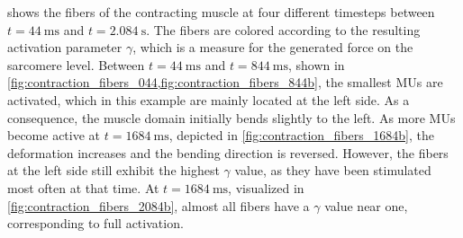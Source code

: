  shows the fibers of the contracting muscle at four different timesteps between $t=\SI{44}{\ms}$ and $t=\SI{2.084}{\s}$. The fibers are colored according to the resulting activation parameter $\gamma$, which is a measure for the generated force on the sarcomere level. Between $t=\SI{44}{\ms}$ and $t=\SI{844}{\ms}$, shown in \cref{fig:contraction_fibers_044,fig:contraction_fibers_844b}, the smallest MUs are activated, which in this example are mainly located at the left side. As a consequence, the muscle domain initially bends slightly to the left. As more MUs become active at $t=\SI{1684}{\ms}$, depicted in \cref{fig:contraction_fibers_1684b}, the deformation increases and the bending direction is reversed. However, the fibers at the left side still exhibit the highest $\gamma$ value, as they have been stimulated most often at that time.
At $t=\SI{1684}{\ms}$, visualized in \cref{fig:contraction_fibers_2084b}, almost all fibers have a $\gamma$ value near one, corresponding to full activation.

